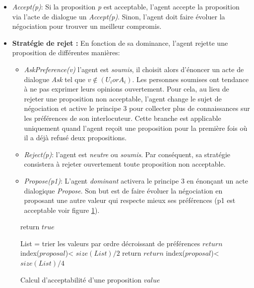 	\begin{itemize}	
		\item  \emph{Accept(p)}: Si la proposition \emph{p} est acceptable, l'agent accepte la proposition via l'acte de dialogue un \emph{Accept(p)}. Sinon, l'agent doit faire évoluer la négociation pour trouver un meilleur compromis. 
		\item \textbf{Stratégie de rejet :} En fonction de sa dominance, l'agent rejette une proposition de différentes manières:
		\begin{itemize}[label= $\circ$]
			\item \emph{AskPreference(v)} l'agent est \emph{soumis}, il choisit alors d'énoncer un acte de dialogue \emph{Ask} tel que $v \not\in (U_i or A_i)$. Les personnes soumises ont tendance à ne pas exprimer leurs opinions ouvertement. Pour cela, au lieu de rejeter une proposition non acceptable, l'agent change le sujet de négociation et active le principe 3 pour collecter plus de connaissances sur les préférences de son interlocuteur. Cette branche est applicable uniquement quand l'agent reçoit une proposition pour la première fois où il a déjà refusé deux propositions.  
			
			\item \emph{Reject(p)}: l'agent est \emph{neutre} ou \emph{soumis}. Par conséquent, sa stratégie consistera à rejeter ouvertement toute proposition non acceptable.
			
			\item \emph{Propose(p1)}: L'agent \emph{dominant} activera le principe 3 en énonçant un acte dialogique \emph{Propose}. Son but est de faire évoluer la négociation en proposant une autre valeur qui respecte mieux ses préférences (p1 est acceptable voir figure \ref{alg:pseudo}). 
		
		\end{itemize}
	\end{itemize}
	\begin{figure}[]
		\caption{\label{alg:pseudo} Calcul d'acceptabilité d'une proposition $value$}
		\begin{algorithmic}[1]
			\State return $true$
			\EndIf
			
			\State List = trier les valeurs par ordre décroissant de préférences
			\State $return$ index($proposal$)< $size(List)/2$
			\EndIf
			\State return $return$ index($proposal$)< $size(List)/4$
			\EndIf
			\EndFunction
		\end{algorithmic}
	\end{figure}
	
